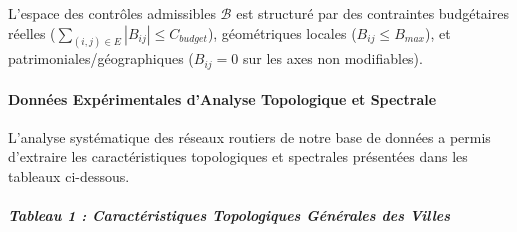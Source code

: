 \documentclass[10pt, a4paper]{article}
\begin{document}
L'espace des contrôles admissibles \(\mathcal{B}\) est structuré par des
contraintes budgétaires réelles
(\(\sum_{(i,j) \in E} |B_{ij}| \le C_{budget}\)), géométriques locales
(\(B_{ij} \le B_{max}\)), et patrimoniales/géographiques (\(B_{ij} = 0\)
sur les axes non modifiables).

\paragraph{Données Expérimentales d'Analyse Topologique et
Spectrale}\label{donnuxe9es-expuxe9rimentales-danalyse-topologique-et-spectrale}

L'analyse systématique des réseaux routiers de notre base de données a
permis d'extraire les caractéristiques topologiques et spectrales
présentées dans les tableaux ci-dessous.

\subparagraph{Tableau 1 : Caractéristiques Topologiques Générales des
Villes}\label{tableau-1-caractuxe9ristiques-topologiques-guxe9nuxe9rales-des-villes}
\end{document}
